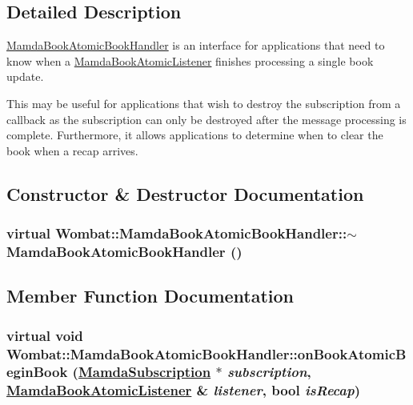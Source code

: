 \subsection{Detailed Description}
\hyperlink{classWombat_1_1MamdaBookAtomicBookHandler}{Mamda\-Book\-Atomic\-Book\-Handler} is an interface for applications that need to know when a \hyperlink{classWombat_1_1MamdaBookAtomicListener}{Mamda\-Book\-Atomic\-Listener} finishes processing a single book update. 

This may be useful for applications that wish to destroy the subscription from a callback as the subscription can only be destroyed after the message processing is complete. Furthermore, it allows applications to determine when to clear the book when a recap arrives. 



\subsection{Constructor \& Destructor Documentation}
\hypertarget{classWombat_1_1MamdaBookAtomicBookHandler_91dc42d1b4fad75fd1322e12b07d0f41}{
\subsubsection[$\sim$MamdaBookAtomicBookHandler]{\setlength{\rightskip}{0pt plus 5cm}virtual Wombat::Mamda\-Book\-Atomic\-Book\-Handler::$\sim$Mamda\-Book\-Atomic\-Book\-Handler ()}}
\label{classWombat_1_1MamdaBookAtomicBookHandler_91dc42d1b4fad75fd1322e12b07d0f41}




\subsection{Member Function Documentation}
\hypertarget{classWombat_1_1MamdaBookAtomicBookHandler_5a895e439d85c872efd611e0c224fe3b}{
\subsubsection[onBookAtomicBeginBook]{\setlength{\rightskip}{0pt plus 5cm}virtual void Wombat::Mamda\-Book\-Atomic\-Book\-Handler::on\-Book\-Atomic\-Begin\-Book (\hyperlink{classWombat_1_1MamdaSubscription}{Mamda\-Subscription} $\ast$ {\em subscription}, \hyperlink{classWombat_1_1MamdaBookAtomicListener}{Mamda\-Book\-Atomic\-Listener} \& {\em listener}, bool {\em is\-Recap})}}
\label{classWombat_1_1MamdaBookAtomicBookHandler_5a895e439d85c872efd611e0c224fe3b}


